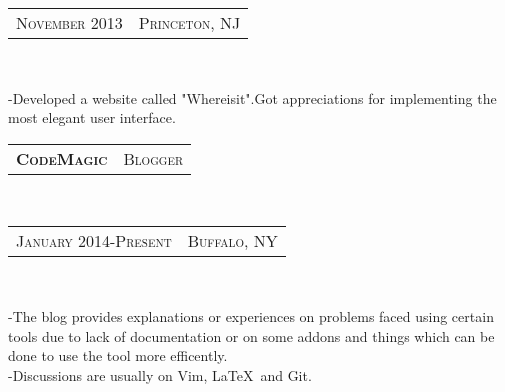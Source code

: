 \documentclass[10pt,a4paper,oneside]{article}
\begin{document}
    \textcolor{light-gray}{
        \begin{tabular}{c|c}
            {\small N\textsc{ovember 2013}}
            &{\small P\textsc{rinceton}, NJ}
        \end{tabular}
    }\\
    \vspace{-12pt}
    \begin{adjustwidth}{7pt}{0pt}
        {\footnotesize -Developed a website called "Whereisit".Got appreciations for implementing  the
        most elegant user interface.}\\
    \end{adjustwidth}
    \begin{tabular}{c|c}
        \textbf{\normalsize C\textsc{ode}M\textsc{agic}}
        &\textmd{\normalsize B\textsc{logger}}
    \end{tabular}\\
    \textcolor{light-gray}{
        \begin{tabular}{c|c}
            {\small J\textsc{anuary 2014}-P\textsc{resent}}
            &{\small B\textsc{uffalo}, NY}
        \end{tabular}
    }\\ 
    \vspace{-4mm}
    \begin{adjustwidth}{7pt}{0pt}
        {\footnotesize -The blog provides explanations or experiences on problems faced using certain tools due to lack
        of documentation or on some addons and things which can be done to use the tool more efficently.}\\
        {\footnotesize -Discussions are usually on Vim, \LaTeX \  and Git. }
    \end{adjustwidth}
    \vspace{10pt}
    \begin{comment}
        \begin{tabular}{c}
        \textbf{\normalsize A\textsc{ffiliations}}\\
        \end{tabular}
        \begin{adjustwidth}{7pt}{0pt}
            {\footnotesize \textbf{International Society of Technical Education(09-12)} -Participated in several events and
            organised a few events.}\\
            {\footnotesize \textbf{Computer Society of India(09-12)} -Member since 2009,organised few workshops and
        tutorial sessions.}
            \vspace{0pt}\\
        \end{adjustwidth} 
    \end{comment}
\end{document}
